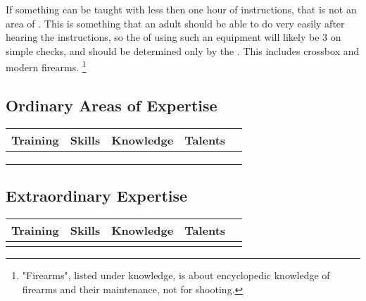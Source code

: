 If something can be taught with less then one hour of instructions, that is not an area of .
This is something that an adult should be able to do very easily after hearing the instructions,
so the  of using such an equipment will likely be 3 on simple checks,
and should be determined only by the .
This includes crossbox and modern firearms.
\footnote{"Firearms", listed under knowledge, is about encyclopedic knowledge of firearms and their maintenance, not for shooting.}


\subsection{Ordinary Areas of Expertise}

\begin{center}
	\scriptsize
	\begin{xltabular}{\textwidth}{XXXXl}
		Training				&	Skills					& Knowledge					&  Talents 				& \\
		\hline
		\listUniversalTraining	&	\listUniversalSkills	&	\listUniversalKnowledge	& \listUniversalTalents &  \\
		\listModernTraining		&	\listModernSkills		&	\listModernKnowledge	& \listModernTalents	&  \\
		\listMedievalTraining	&	\listMedievalSkills		&	\listMedievalKnowledge	&   					&  \\
	\end{xltabular}
\end{center}

\subsection{Extraordinary Expertise}

\begin{center}
	\begin{xltabular}{\textwidth}{XXXXl}
		Training								&	Skills									& Knowledge								&  Talents & \\
		\hline
		\footnotesize \listFantasyTraining		&	\footnotesize	\listFantasySkills		&\footnotesize \listFantasyKnowledge	& \footnotesize  \listFantasyTalents 	&  \\
	\end{xltabular}
\end{center}

